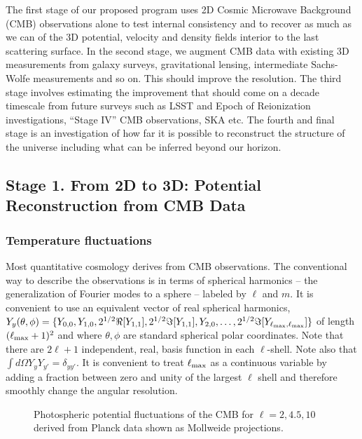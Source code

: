 \documentclass[psfig,11pt]{article}
\begin{document}
The first stage of our proposed program uses 2D Cosmic Microwave Background (CMB) observations alone to test internal consistency and to recover as much as we can of the 3D potential, velocity and density fields interior to the last scattering surface. In the second stage, we augment CMB data with existing 3D measurements from galaxy surveys, gravitational lensing, intermediate Sachs-Wolfe measurements and so on. This should improve the resolution. The third stage involves estimating the improvement that should come on a decade timescale from future surveys such as LSST and Epoch of Reionization investigations, ``Stage IV'' CMB observations, SKA etc. The fourth and final stage is an investigation of how far it is possible to reconstruct the structure of the universe including what can be inferred beyond our horizon.


\subsection{Stage 1. From 2D to 3D: Potential Reconstruction from CMB Data}

\subsubsection{Temperature fluctuations}

Most quantitative cosmology derives from CMB observations. The conventional way to describe the observations is in terms of spherical harmonics -- the generalization of Fourier modes to a sphere -- labeled by $\ell$ and $m$. It is convenient to use an equivalent vector of real spherical harmonics, $Y_y(\theta,\phi)=\{Y_{0,0},Y_{1,0},2^{1/2}\Re[Y_{1,1}],2^{1/2}\Im[Y_{1,1}],Y_{2,0},\dots,2^{1/2}\Im[Y_{\ell_{\rm max},\ell_{\rm max}}]\}$ of length $(\ell_{\rm max}+1)^2$ and where $\theta,\phi$ are standard spherical polar coordinates. Note that there are $2\ell+1$ independent, real, basis function in each $\ell$-shell. Note also that $\int d\Omega Y_yY_{y'}=\delta_{yy'}$. It is convenient to treat $\ell_{\rm max}$ as a continuous variable by adding a fraction between zero and unity of the largest $\ell$ shell and therefore smoothly change the angular resolution.
\begin{figure}[t]
\centering
\caption{Photospheric potential fluctuations of the CMB for $\ell=2,4.5,10$ derived from Planck data shown as Mollweide projections.}
\end{figure}
\end{document}
